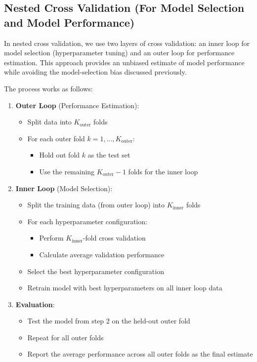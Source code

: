 \subsection{Nested Cross Validation (For Model Selection and Model Performance)}

In nested cross validation, we use two layers of cross validation: an inner loop for model selection (hyperparameter tuning) and an outer loop for performance estimation. This approach provides an unbiased estimate of model performance while avoiding the model-selection bias discussed previously.

The process works as follows:

\begin{enumerate}
\item \textbf{Outer Loop} (Performance Estimation):
   \begin{itemize}
   \item Split data into $K_{\mathrm{outer}}$ folds
   \item For each outer fold $k = 1, ..., K_{\mathrm{outer}}$:
     \begin{itemize}
     \item Hold out fold $k$ as the test set
     \item Use the remaining $K_{\mathrm{outer}} - 1$ folds for the inner loop
     \end{itemize}
   \end{itemize}

\item \textbf{Inner Loop} (Model Selection):
   \begin{itemize}
   \item Split the training data (from outer loop) into $K_{\mathrm{inner}}$ folds
   \item For each hyperparameter configuration:
     \begin{itemize}
     \item Perform $K_{\mathrm{inner}}$-fold cross validation
     \item Calculate average validation performance
     \end{itemize}
   \item Select the best hyperparameter configuration
   \item Retrain model with best hyperparameters on all inner loop data
   \end{itemize}

\item \textbf{Evaluation}:
   \begin{itemize}
   \item Test the model from step 2 on the held-out outer fold
   \item Repeat for all outer folds
   \item Report the average performance across all outer folds as the final estimate
   \end{itemize}
\end{enumerate}

